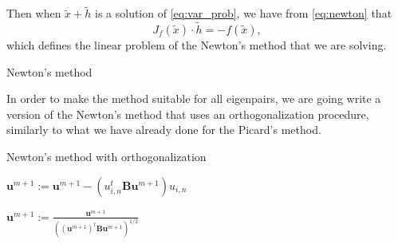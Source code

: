 \documentclass[preprint,12pt]{elsarticle}
\begin{document}
Then when $\tilde x + \tilde h$ is a solution of \eqref{eq:var_prob}, we have from \eqref{eq:newton}
that 
$$
J_f(\tilde x)\cdot \tilde h = - f(\tilde x),
$$
which defines the linear problem of the Newton's method that we are solving.
\begin{algorithm}[H] \caption{Newton's method} \label{alg:newton} 
\begin{algorithmic}


\REPEAT

\end{algorithmic}
\end{algorithm}

In order to make the method suitable for all eigenpairs, we are going write a version of the Newton's method that uses an orthogonalization procedure, similarly to what we have already done for the Picard's method.
\begin{algorithm}[H] \caption{Newton's method with orthogonalization} \label{alg:newton_ortho} 
\begin{algorithmic}

    

\REPEAT



\STATE $\mathbf{u}^{m+1}:=\mathbf{u}^{m+1}-(u_{i,n}^t\mathbf{B}\mathbf{u}^{m+1})u_{i,n}$
\ENDFOR


\STATE $\displaystyle \mathbf{u}^{m+1}:=\frac{\mathbf{u}^{m+1}}{((\mathbf{u}^{m+1})^t\mathbf{B}\mathbf{u}^{m+1})^{1/2}}$
\end{algorithmic}
\end{algorithm}
\end{document}
